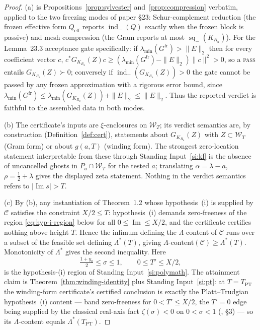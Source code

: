 \documentclass[11pt]{article}
\theoremstyle{definition}
\theoremstyle{remark}
\newcommand{\indm}{\operatorname{ind}_{-}}
\newcommand{\sq}{\operatorname{sq}_{-}}
\newcommand{\im}{\operatorname{Im}}
\newcommand{\band}[1]{\mathcal{W}_{#1}}
\newcommand{\TPT}{T_{\mathrm{PT}}}
\begin{document}
\begin{proof}
(a) is Propositions~\ref{prop:sylvester} and~\ref{prop:compression} verbatim,
applied to the two freezing modes of paper \S23: Schur-complement reduction
(the frozen effective form $Q_{\mathrm{eff}}$ reports $\indm(Q)$ exactly when
the frozen block is passive) and mesh compression (the Gram reports at most
$\sq(K_{R_a})$). For the Lemma~23.3 acceptance gate specifically: if
$\lambda_{\min}(G^{\mathrm{fr}})>\|E\|_2$ then for every coefficient vector $c$,
$c^{*}G_{K_{R_a}}(Z)c\ge(\lambda_{\min}(G^{\mathrm{fr}})-\|E\|_2)\|c\|^2>0$, so a
\textsc{pass} entails $G_{K_{R_a}}(Z)\succ0$; conversely if
$\indm(G_{K_{R_a}}(Z))>0$ the gate cannot be passed by any frozen
approximation with a rigorous error bound, since
$\lambda_{\min}(G^{\mathrm{fr}})\le\lambda_{\min}(G_{K_{R_a}}(Z))+\|E\|_2\le\|E\|_2$.
Thus the reported verdict is faithful to the assembled data in both modes.

(b) The certificate's inputs are $\xi$-enclosures on $\band{T}$; its verdict
semantics are, by construction (Definition~\ref{def:cert}), statements about
$G_{K_{R_a}}(Z)$ with $Z\subset\band{T}$ (Gram form) or about $g(a,T)$
(winding form). The strongest zero-location statement interpretable from
these through Standing Input~\ref{si:kl} is the absence of uncancelled ghosts
in $P_a\cap\band{T}$ for the tested $a$; translating $\alpha=\lambda-a$,
$\rho=\tfrac12+\lambda$ gives the displayed zeta statement. Nothing in the
verdict semantics refers to $|\im s|>T$.

(c) By (b), any instantiation of Theorem~1.2 whose hypothesis~(i) is supplied
by $\mathcal{C}$ satisfies the constraint $X/2\le T$: hypothesis~(i) demands
zero-freeness of the region \eqref{eq:hyp-i-region} below for all
$0\le\im\le X/2$, and the certificate certifies nothing above height $T$.
Hence the infimum defining the $\Lambda$-content of $\mathcal{C}$ runs over a
subset of the feasible set defining $\Lambda^{*}(T)$, giving
$\Lambda\text{-content}(\mathcal{C})\ge\Lambda^{*}(T)$. Monotonicity of
$\Lambda^{*}$ gives the second inequality. Here
\begin{equation}\label{eq:hyp-i-region}
\tfrac{1+y_0}{2}\le\sigma\le1,\qquad 0\le T'\le X/2,
\end{equation}
is the hypothesis-(i) region of Standing Input~\ref{si:polymath}. The
attainment claim is Theorem~\ref{thm:winding-identity} plus Standing
Input~\ref{si:pt}: at $T=\TPT$ the winding-form certificate's certified
conclusion is exactly the Platt--Trudgian hypothesis~(i) content --- band
zero-freeness for $0<T'\le X/2$, the $T'=0$ edge being supplied by the
classical real-axis fact $\zeta(\sigma)<0$ on $0<\sigma<1$
(\cite{ProofNote}, \S3) --- so its $\Lambda$-content equals
$\Lambda^{*}(\TPT)$.
\end{proof}
\end{document}
